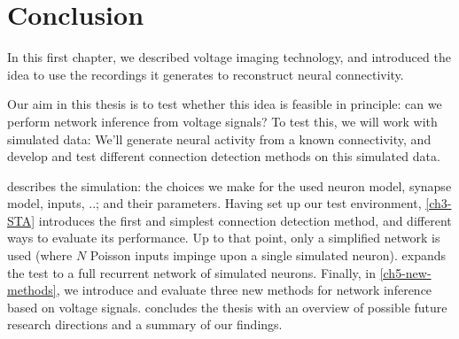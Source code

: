 \section{Conclusion}

In this first chapter, we described voltage imaging technology, and introduced the idea to use the recordings it generates to reconstruct neural connectivity.

Our aim in this thesis is to test whether this idea is feasible in principle: can we perform network inference from voltage signals? To test this, we will work with simulated data: We'll generate neural activity from a known connectivity, and develop and test different connection detection methods on this simulated data.

 describes the simulation: the choices we make for the used neuron model, synapse model, inputs, ..; and their parameters. Having set up our test environment, \cref{ch3-STA} introduces the first and simplest connection detection method, and different ways to evaluate its performance. Up to that point, only a simplified network is used (where $N$ Poisson inputs impinge upon a single simulated neuron).  expands the test to a full recurrent network of simulated neurons. Finally, in \cref{ch5-new-methods}, we introduce and evaluate three new methods for network inference based on voltage signals.  concludes the thesis with an overview of possible future research directions and a summary of our findings.
